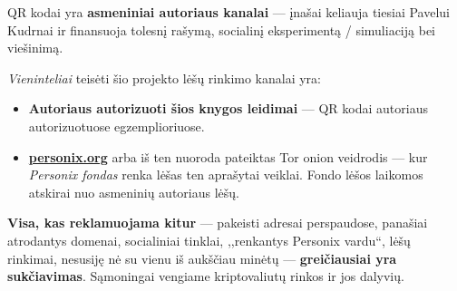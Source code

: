 \begin{minipage}[t]{0.60\textwidth}
\vspace{0pt}
\begin{mdframed}[
  linewidth=0.7pt,roundcorner=5pt,
  innerleftmargin=10pt,innerrightmargin=10pt,
  innertopmargin=8pt,innerbottommargin=8pt,
  skipabove=0pt,skipbelow=0pt,
  linecolor=cbwarning!50,backgroundcolor=cbwarning!5,
  nobreak=true,
  needspace=4\baselineskip,
]
\footnotesize
QR kodai yra \textbf{asmeniniai autoriaus kanalai} --- įnašai keliauja tiesiai Pavelui Kudrnai ir finansuoja tolesnį rašymą, socialinį eksperimentą / simuliaciją bei viešinimą.

\smallskip
\emph{Vieninteliai} teisėti šio projekto lėšų rinkimo kanalai yra:

\smallskip
\begin{itemize}
\setlength{\itemsep}{0pt}
\setlength{\topsep}{0pt}
\item \textbf{Autoriaus autorizuoti šios knygos leidimai} --- QR kodai autoriaus autorizuotuose egzemplioriuose.
\item \href{https://personix.org}{\textbf{personix.org}} arba iš ten nuoroda pateiktas Tor onion veidrodis --- kur \emph{Personix fondas} renka lėšas ten aprašytai veiklai. Fondo lėšos laikomos atskirai nuo asmeninių autoriaus lėšų.
\end{itemize}

\smallskip
\textbf{Visa, kas reklamuojama kitur} --- pakeisti adresai perspaudose, panašiai atrodantys domenai, socialiniai tinklai, ,,renkantys Personix vardu``, lėšų rinkimai, nesusiję nė su vienu iš aukščiau minėtų --- \textbf{greičiausiai yra sukčiavimas}. Sąmoningai vengiame kriptovaliutų rinkos ir jos dalyvių.
\end{mdframed}
\end{minipage}

\clearpage
